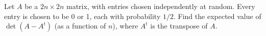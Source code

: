Let $A$ be a $2n \times 2n$ matrix, with entries chosen independently at random. Every entry is chosen to be 0 or 1, each with probability $1/2$. Find the expected value of $\det(A-A^t)$ (as a function of $n$), where $A^t$ is the transpose of $A$.
